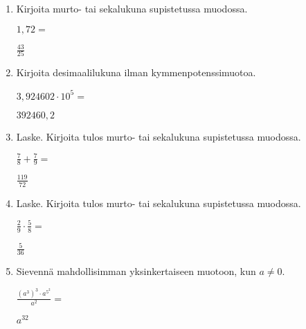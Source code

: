 \documentclass[finnish, a4paper, 12pt]{article}
\begin{document}
	\begin{enumerate}[leftmargin=*]
		\setlength\itemsep{1em}
		
		\item %
		Kirjoita murto- tai sekalukuna supistetussa muodossa. 
		
		\(
		1{,}72 = 
		\) %
		
		\begin{version:withAnswers}
		\( \frac{43}{25} \)
		\end{version:withAnswers}

		\vspace{8pt}
		
		\item %
		Kirjoita desimaalilukuna ilman kymmenpotenssimuotoa. 
		
		\(
		3{,}924602\cdot 10^{5} = 
		\) %
		\begin{version:withAnswers}
		\( 392460,2 \)
		\end{version:withAnswers}	
		\vspace{8pt}
		
		\item %
		Laske. Kirjoita tulos murto- tai sekalukuna supistetussa muodossa.
		
		\(
		\displaystyle
		\frac{7}{8}+\frac{7}{9} = 
		\) %
		\begin{version:withAnswers}
		\( \frac{119}{72} \)
		\end{version:withAnswers}	
		
		\vspace{8pt}
		
		\item %
		Laske. Kirjoita tulos murto- tai sekalukuna supistetussa muodossa.
		
		\(
		\displaystyle
		\frac{2}{9}\cdot\frac{5}{8} = 
		\) %
		\begin{version:withAnswers}
		\( \frac{5}{36} \)
		\end{version:withAnswers}
		
		\vspace{8pt}
		
		\item %
		Sievennä mahdollisimman yksinkertaiseen muotoon, kun \(a \not = 0\). 
		
		\(
		\displaystyle
		\frac{\left(a^3\right)^3 \cdot a^{5^2}}{a^2} =
		\phantom{mmmmmmmmmmmmmmm}
		\) %
		\begin{version:withAnswers}
		\(  a^{32} \)
		\end{version:withAnswers}
		

\end{enumerate}
\end{document}
